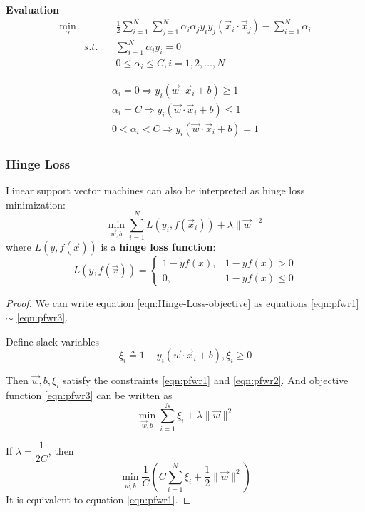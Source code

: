 \textbf{Evaluation}
\begin{eqnarray}
 \min_{\alpha} && \frac{1}{2} \sum\limits_{i=1}^N\sum\limits_{j=1}^N \alpha_i\alpha_j y_i y_j (\vec{x}_i \cdot \vec{x}_j) - \sum\limits_{i=1}^N \alpha_i \\
               & s.t.  \quad & \sum\limits_{i=1}^N\alpha_i y_i=0 \\
               && 0 \leqslant  \alpha_i \leqslant C, i=1,2, \dots, N
\end{eqnarray}

\begin{eqnarray}
\alpha_i=0 \Rightarrow y_i(\vec{w} \cdot \vec{x}_i+b)\geqslant 1 \\
\alpha_i=C \Rightarrow y_i(\vec{w} \cdot \vec{x}_i+b)\leqslant 1 \\
0<\alpha_i<C \Rightarrow y_i(\vec{w} \cdot \vec{x}_i+b)= 1
\end{eqnarray}


\subsubsection{Hinge Loss}
Linear support vector machines can also be interpreted as hinge loss minimization:
\begin{equation}\label{eqn:Hinge-Loss-objective}
\min_{\vec{w},b} \sum\limits_{i=1}^N{L(y_i,f(\vec{x}_i))} + \lambda\|\vec{w}\|^2
\end{equation}
where $L(y, f(\vec{x}))$ is a \textbf{hinge loss function}:
\begin{equation}
L(y, f(\vec{x})) = \begin{cases}
1-yf(x),  & 1-yf(x) > 0 \\
0,  & 1-yf(x) \leqslant 0
\end{cases}
\end{equation}

\begin{proof}
We can write equation \eqref{eqn:Hinge-Loss-objective} as equations \eqref{eqn:pfwr1} $\sim$ \eqref{eqn:pfwr3}.

Define slack variables
\begin{equation}
\xi_i \triangleq 1-y_i(\vec{w} \cdot \vec{x}_i + b),\xi_i \geqslant 0
\end{equation}

Then $\vec{w},b,\xi_i$ satisfy the constraints \eqref{eqn:pfwr1} and \eqref{eqn:pfwr2}. And objective function \eqref{eqn:pfwr3} can be written as
\begin{equation}
\min_{\vec{w},b} \sum\limits_{i=1}^N{\xi_i}+ \lambda\|\vec{w}\|^2 \nonumber
\end{equation}

If $\lambda=\dfrac{1}{2C}$, then 
\begin{equation}
\min_{\vec{w},b} \dfrac{1}{C}\left(C\sum\limits_{i=1}^N{\xi_i}+\dfrac{1}{2}\|\vec{w}\|^2\right)
\end{equation}
It is equivalent to equation \eqref{eqn:pfwr1}.

\end{proof}



